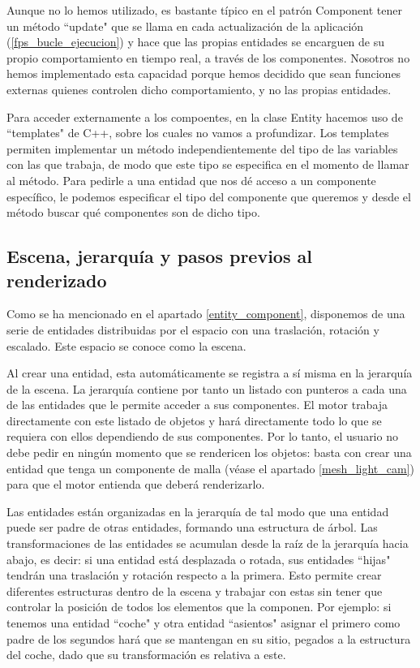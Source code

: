 Aunque no lo hemos utilizado, es bastante típico en el patrón Component tener un método ``update" que se llama en cada actualización de la aplicación (\ref{fps_bucle_ejecucion}) y hace que las propias entidades se encarguen de su propio comportamiento en tiempo real, a través de los componentes. Nosotros no hemos implementado esta capacidad porque hemos decidido que sean funciones externas quienes controlen dicho comportamiento, y no las propias entidades.

Para acceder externamente a los compoentes, en la clase Entity hacemos uso de ``templates" de C++, sobre los cuales no vamos a profundizar. Los templates permiten implementar un método independientemente del tipo de las variables con las que trabaja, de modo que este tipo se especifica en el momento de llamar al método. Para pedirle a una entidad que nos dé acceso a un componente específico, le podemos especificar el tipo del componente que queremos y desde el método buscar qué componentes son de dicho tipo.

\subsection{Escena, jerarquía y pasos previos al renderizado}
\label{scene_hierarchy}
Como se ha mencionado en el apartado \ref{entity_component}, disponemos de una serie de entidades distribuidas por el espacio con una traslación, rotación y escalado. Este espacio se conoce como la escena.

Al crear una entidad, esta automáticamente se registra a sí misma en la jerarquía de la escena. La jerarquía contiene por tanto un listado con punteros a cada una de las entidades que le permite acceder a sus componentes. El motor trabaja directamente con este listado de objetos y hará directamente todo lo que se requiera con ellos dependiendo de sus componentes. Por lo tanto, el usuario no debe pedir en ningún momento que se rendericen los objetos: basta con crear una entidad que tenga un componente de malla (véase el apartado \ref{mesh_light_cam}) para que el motor entienda que deberá renderizarlo.

Las entidades están organizadas en la jerarquía de tal modo que una entidad puede ser padre de otras entidades, formando una estructura de árbol. Las transformaciones de las entidades se acumulan desde la raíz de la jerarquía hacia abajo, es decir: si una entidad está desplazada o rotada, sus entidades ``hijas" tendrán una traslación y rotación respecto a la primera. Esto permite crear diferentes estructuras dentro de la escena y trabajar con estas sin tener que controlar la posición de todos los elementos que la componen. Por ejemplo: si tenemos una entidad ``coche" y otra entidad ``asientos" asignar el primero como padre de los segundos hará que se mantengan en su sitio, pegados a la estructura del coche, dado que su transformación es relativa a este.


